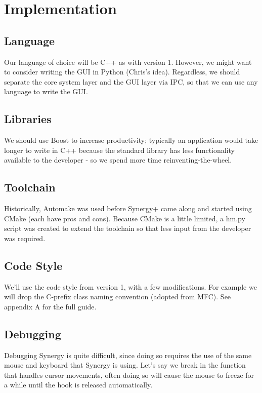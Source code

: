 \section{Implementation}

\subsection{Language}

Our language of choice will be C++ as with version 1. However, we might want to
consider writing the GUI in Python (Chris's idea). Regardless, we should 
separate the core system layer and the GUI layer via IPC, so that we can use
any language to write the GUI.

\subsection{Libraries}

We should use Boost to increase productivity; typically an application would
take longer to write in C++ because the standard library has less functionality
available to the developer - so we spend more time reinventing-the-wheel.

\subsection{Toolchain}

Historically, Automake was used before Synergy+ came along and started using
CMake (each have pros and cons). Because CMake is a little limited, a hm.py 
script was created to extend the toolchain so that less input from the developer
was required.


\subsection{Code Style}

We'll use the code style from version 1, with a few modifications. For example 
we will drop the C-prefix class naming convention (adopted from MFC). See 
appendix A for the full guide.

\subsection{Debugging}

Debugging Synergy is quite difficult, since doing so requires the use of the 
same mouse and keyboard that Synergy is using. Let's say we break in the 
function that handles cursor movements, often doing so will cause the mouse
to freeze for a while until the hook is released automatically.

